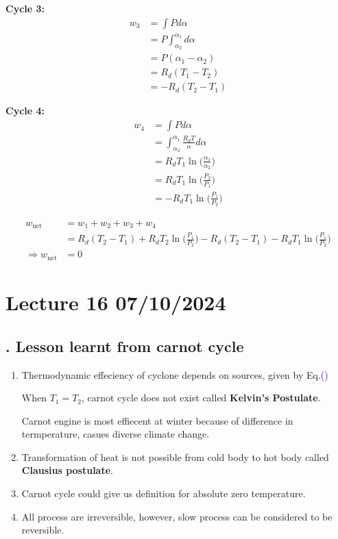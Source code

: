 \documentclass[fleqn,10pt]{SelfArx} %
\newcommand{\myeqref}[1]{\textcolor{blue}{\textup{(\getrefnumber{#1})}}}
\begin{document}
\textbf{Cycle 3:}
\begin{align*}
    w_3 &= \int P d\alpha  \\
        &= P \int_{\alpha_2}^{\alpha_1} d\alpha \\
        &= P(\alpha_1 - \alpha_2) \\
        &= R_d(T_1-T_2) \\
        &= - R_d(T_2-T_1)
\end{align*}

\textbf{Cycle 4:}
\begin{align*}
    w_4 &= \int P d\alpha  \\
        &= \int_{\alpha_2}^{\alpha_1} \frac{R_d T}{\alpha} d\alpha \\
        &= R_d T_1 \ln \Big(\frac{\alpha_1}{\alpha_2}\Big) \\
        &= R_d T_1 \ln \Big(\frac{P_2}{P_1}\Big) \\
        &= - R_d T_1 \ln \Big(\frac{P_1}{P_2}\Big)
\end{align*}

\begin{align*}
    w_{\text{net}} &= w_1 + w_2 + w_3 + w_4 \\
                   &= R_d(T_2-T_1) + R_d T_2 \ln \Big(\frac{P_1}{P_2}\Big) - R_d(T_2-T_1) - R_d T_1 \ln \Big(\frac{P_1}{P_2}\Big) \\
    \Rightarrow w_{\text{net}} &= 0
\end{align*}

\clearpage

\section{Lecture 16 07/10/2024}

\subsection{. Lesson learnt from carnot cycle}
\begin{enumerate}[I]
    \item Thermodynamic effeciency of cyclone depends on sources, given by Eq.\myeqref{eq:eff_carnot}

    When $T_1 =T_2$, carnot cycle does not exist called \textbf{Kelvin's Postulate}.

    Carnot engine is most effiecent at winter because of difference in termperature, casues diverse climate change.

    \item Transformation of heat is not possible from cold body to hot body called \textbf{Clausius postulate}.

    \item Carnot cycle could give us definition for absolute zero temperature.

    \item All process are irreversible, however, slow process can be considered to be reversible.
\end{enumerate}
\end{document}
